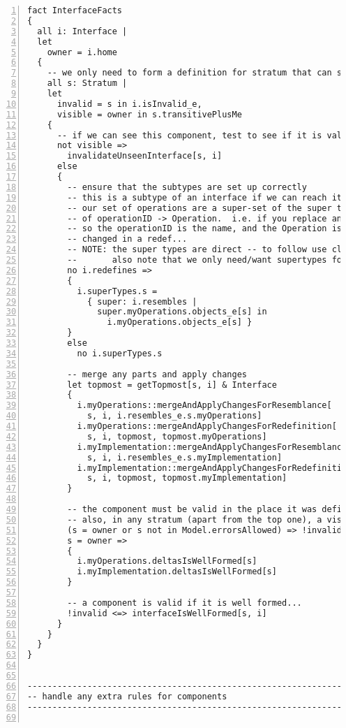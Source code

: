 \begin{lstlisting}[caption={facts.als}, numbers=left]
fact InterfaceFacts
{
  all i: Interface |
  let
    owner = i.home
  {
    -- we only need to form a definition for stratum that can see us
    all s: Stratum |
    let
      invalid = s in i.isInvalid_e,
      visible = owner in s.transitivePlusMe
    {
      -- if we can see this component, test to see if it is valid in this stratum
      not visible =>
        invalidateUnseenInterface[s, i]
      else
      {
        -- ensure that the subtypes are set up correctly
        -- this is a subtype of an interface if we can reach it transitively and
        -- our set of operations are a super-set of the super type's
        -- of operationID -> Operation.  i.e. if you replace an operationID you are breaking subtype
        -- so the operationID is the name, and the Operation is the full spec which is assumed to have
        -- changed in a redef...
        -- NOTE: the super types are direct -- to follow use closure
        --       also note that we only need/want supertypes for non-primes
        no i.redefines =>
        {
          i.superTypes.s =
            { super: i.resembles |
              super.myOperations.objects_e[s] in
                i.myOperations.objects_e[s] }
        }
        else
          no i.superTypes.s
      
        -- merge any parts and apply changes
        let topmost = getTopmost[s, i] & Interface
        {
          i.myOperations::mergeAndApplyChangesForResemblance[
            s, i, i.resembles_e.s.myOperations]
          i.myOperations::mergeAndApplyChangesForRedefinition[
            s, i, topmost, topmost.myOperations]
          i.myImplementation::mergeAndApplyChangesForResemblance[
            s, i, i.resembles_e.s.myImplementation]
          i.myImplementation::mergeAndApplyChangesForRedefinition[
            s, i, topmost, topmost.myImplementation]
        }

        -- the component must be valid in the place it was defined
        -- also, in any stratum (apart from the top one), a visible component must be valid
        (s = owner or s not in Model.errorsAllowed) => !invalid
        s = owner =>
        {
          i.myOperations.deltasIsWellFormed[s]
          i.myImplementation.deltasIsWellFormed[s]
        }
        
        -- a component is valid if it is well formed...
        !invalid <=> interfaceIsWellFormed[s, i]
      }
    }
  }
}


--------------------------------------------------------------------
-- handle any extra rules for components
--------------------------------------------------------------------


\end{lstlisting}

